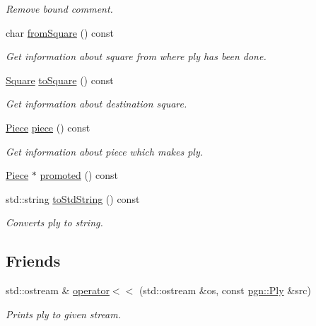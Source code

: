 \begin{DoxyCompactItemize}
\begin{DoxyCompactList}\small\item\em Remove bound comment. \item\end{DoxyCompactList}\item 
char \hyperlink{classpgn_1_1Ply_a1ffe8bb29a5ac3d0c2ab0d3004aaddd3}{fromSquare} () const 
\begin{DoxyCompactList}\small\item\em Get information about square from where ply has been done. \item\end{DoxyCompactList}\item 
\hyperlink{classpgn_1_1Square}{Square} \hyperlink{classpgn_1_1Ply_ab345f182919aed0853073f1e7b6e88a6}{toSquare} () const 
\begin{DoxyCompactList}\small\item\em Get information about destination square. \item\end{DoxyCompactList}\item 
\hyperlink{classpgn_1_1Piece}{Piece} \hyperlink{classpgn_1_1Ply_adaea7928bf1655338ca0fd33c7c2000d}{piece} () const 
\begin{DoxyCompactList}\small\item\em Get information about piece which makes ply. \item\end{DoxyCompactList}\item 
\hyperlink{classpgn_1_1Piece}{Piece} $\ast$ \hyperlink{classpgn_1_1Ply_a1417080779131decd88bbafe412e5e89}{promoted} () const 
\item 
std::string \hyperlink{classpgn_1_1Ply_a2985fc89a6f181995a93a142d85ed342}{toStdString} () const 
\begin{DoxyCompactList}\small\item\em Converts ply to string. \item\end{DoxyCompactList}\end{DoxyCompactItemize}
\subsection*{Friends}
\begin{DoxyCompactItemize}
\item 
std::ostream \& \hyperlink{classpgn_1_1Ply_a06d0e8fc52490f084fd1ab25a443790a}{operator$<$$<$} (std::ostream \&os, const \hyperlink{classpgn_1_1Ply}{pgn::Ply} \&src)
\begin{DoxyCompactList}\small\item\em Prints ply to given stream. \item\end{DoxyCompactList}\end{DoxyCompactItemize}


